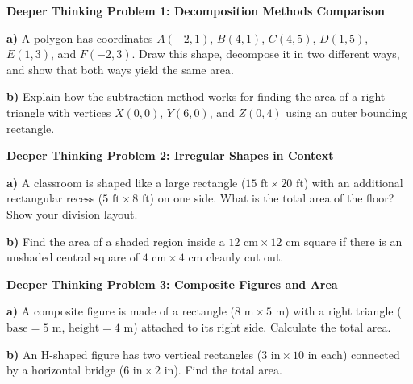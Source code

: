 \documentclass[12pt, letterpaper, fleqn]{article}
\begin{document}
\vspace{4mm}

\begin{tcolorbox}[colback=white, colframe=black, boxrule=1pt, arc=4mm, left=6mm, right=6mm, top=5mm, bottom=5mm]
\textbf{Deeper Thinking Problem 1: Decomposition Methods Comparison}

\medskip
\noindent
\textbf{a)} A polygon has coordinates $A(-2, 1)$, $B(4, 1)$, $C(4, 5)$, $D(1, 5)$, $E(1, 3)$, and $F(-2, 3)$. Draw this shape, decompose it in two different ways, and show that both ways yield the same area.
\vspace{3.5cm}

\noindent
\textbf{b)} Explain how the subtraction method works for finding the area of a right triangle with vertices $X(0, 0)$, $Y(6, 0)$, and $Z(0, 4)$ using an outer bounding rectangle.
\vspace{3.5cm}
\end{tcolorbox}

\begin{tcolorbox}[colback=white, colframe=black, boxrule=1pt, arc=4mm, left=6mm, right=6mm, top=5mm, bottom=5mm]
\textbf{Deeper Thinking Problem 2: Irregular Shapes in Context}

\medskip
\noindent
\textbf{a)} A classroom is shaped like a large rectangle ($15\text{ ft} \times 20\text{ ft}$) with an additional rectangular recess ($5\text{ ft} \times 8\text{ ft}$) on one side. What is the total area of the floor? Show your division layout.
\vspace{3.5cm}

\noindent
\textbf{b)} Find the area of a shaded region inside a $12\text{ cm} \times 12\text{ cm}$ square if there is an unshaded central square of $4\text{ cm} \times 4\text{ cm}$ cleanly cut out.
\vspace{3.5cm}
\end{tcolorbox}


\begin{tcolorbox}[colback=white, colframe=black, boxrule=1pt, arc=4mm, left=6mm, right=6mm, top=5mm, bottom=5mm]
\textbf{Deeper Thinking Problem 3: Composite Figures and Area}

\medskip
\noindent
\textbf{a)} A composite figure is made of a rectangle ($8\text{ m} \times 5\text{ m}$) with a right triangle ($\text{base} = 5\text{ m}$, $\text{height} = 4\text{ m}$) attached to its right side. Calculate the total area.
\vspace{3cm}

\noindent
\textbf{b)} An H-shaped figure has two vertical rectangles ($3\text{ in} \times 10\text{ in}$ each) connected by a horizontal bridge ($6\text{ in} \times 2\text{ in}$). Find the total area.
\vspace{3cm}

\end{tcolorbox}
\end{document}
